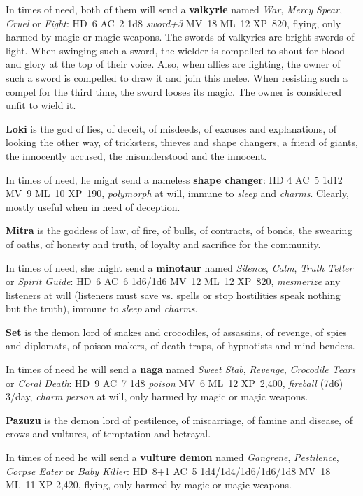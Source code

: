 \documentclass[11pt]{bxart}
\begin{document}
In times of need, both of them will send a \textbf{valkyrie} named
\textit{War}, \textit{Mercy} \textit{Spear}, \textit{Cruel} or
\textit{Fight}: HD~6 AC~2 1d8 \textit{sword+3} MV~18 ML~12 XP~820,
flying, only harmed by magic or magic weapons. The swords of valkyries
are bright swords of light. When swinging such a sword, the wielder is
compelled to shout for blood and glory at the top of their voice.
Also, when allies are fighting, the owner of such a sword is compelled
to draw it and join this melee. When resisting such a compel for the
third time, the sword looses its magic. The owner is considered unfit
to wield it.

\textbf{Loki} is the god of lies, of deceit, of misdeeds, of excuses
and explanations, of looking the other way, of tricksters, thieves and
shape changers, a friend of giants, the innocently accused, the
misunderstood and the innocent.

In times of need, he might send a nameless \textbf{shape changer}: HD
4 AC~5 1d12 MV~9 ML~10 XP~190, \textit{polymorph} at will, immune to
\textit{sleep} and \textit{charms}. Clearly, mostly useful when in
need of deception.

\textbf{Mitra} is the goddess of law, of fire, of bulls, of contracts,
of bonds, the swearing of oaths, of honesty and truth, of loyalty and
sacrifice for the community.

In times of need, she might send a \textbf{minotaur} named
\textit{Silence}, \textit{Calm}, \textit{Truth Teller} or
\textit{Spirit Guide}: HD~6 AC~6 1d6/1d6 MV~12 ML~12 XP~820,
\textit{mesmerize} any listeners at will (listeners must save vs.
spells or stop hostilities speak nothing but the truth), immune to
\textit{sleep} and \textit{charms}.

\textbf{Set} is the demon lord of snakes and crocodiles, of assassins,
of revenge, of spies and diplomats, of poison makers, of death traps,
of hypnotists and mind benders.

In times of need he will send a \textbf{naga} named \textit{Sweet
  Stab}, \textit{Revenge}, \textit{Crocodile Tears} or \textit{Coral
  Death}: HD~9 AC~7 1d8 \textit{poison} MV~6 ML~12 XP~2,400,
\textit{fireball} (7d6) 3/day, \textit{charm person} at will, only
harmed by magic or magic weapons.

\textbf{Pazuzu} is the demon lord of pestilence, of miscarriage, of
famine and disease, of crows and vultures, of temptation and betrayal.

In times of need he will send a \textbf{vulture demon} named
\textit{Gangrene}, \textit{Pestilence}, \textit{Corpse Eater} or
\textit{Baby Killer}: HD~8+1 AC~5 1d4/1d4/1d6/1d6/1d8 MV~18 ML~11 XP
2,420, flying, only harmed by magic or magic weapons.
\end{document}

